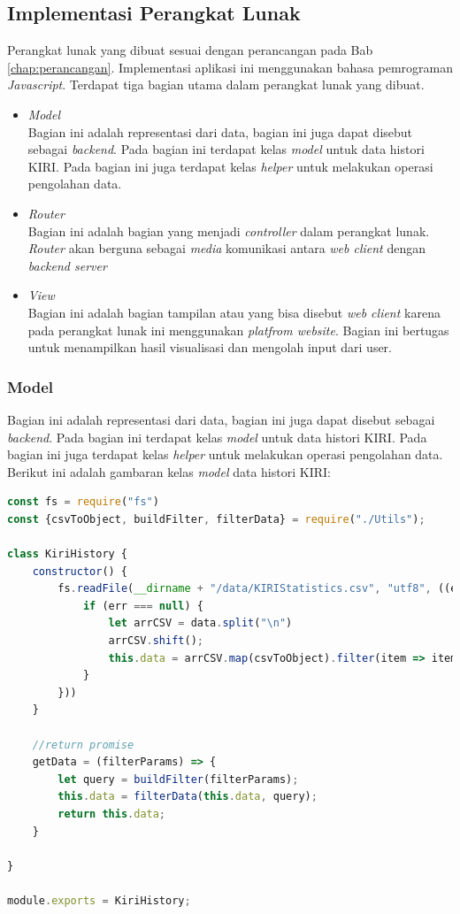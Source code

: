 \subsection{Implementasi Perangkat Lunak}
Perangkat lunak yang dibuat sesuai dengan perancangan pada Bab \ref{chap:perancangan}. Implementasi aplikasi ini menggunakan bahasa pemrograman \textit{Javascript}. Terdapat tiga bagian utama dalam perangkat lunak yang dibuat.

\begin{itemize}
    \item \textit{Model}\\
    Bagian ini adalah representasi dari data, bagian ini juga dapat disebut sebagai \textit{backend}. Pada bagian ini terdapat kelas \textit{model} untuk data histori KIRI. Pada bagian ini juga terdapat kelas \textit{helper} untuk melakukan operasi pengolahan data.
    \item \textit{Router} \\
    Bagian ini adalah bagian yang menjadi \textit{controller} dalam perangkat lunak. \textit{Router} akan berguna sebagai \textit{media} komunikasi antara \textit{web client} dengan \textit{backend server} 
    \item \textit{View} \\
    Bagian ini adalah bagian tampilan atau yang bisa disebut \textit{web client} karena pada perangkat lunak ini menggunakan\textit{ platfrom website}. Bagian ini bertugas untuk menampilkan hasil visualisasi dan mengolah input dari user.
\end{itemize}

\subsubsection{Model}
Bagian ini adalah representasi dari data, bagian ini juga dapat disebut sebagai \textit{backend}. Pada bagian ini terdapat kelas \textit{model} untuk data histori KIRI. Pada bagian ini juga terdapat kelas \textit{helper} untuk melakukan operasi pengolahan data. Berikut ini adalah gambaran kelas \textit{model} data histori KIRI:

\begin{lstlisting}[label=Kiri_Model, language=JavaScript, caption=Metode Load Data, breaklines]
const fs = require("fs")
const {csvToObject, buildFilter, filterData} = require("./Utils");

class KiriHistory {
    constructor() {
        fs.readFile(__dirname + "/data/KIRIStatistics.csv", "utf8", ((err, data) => {
            if (err === null) {
                let arrCSV = data.split("\n")
                arrCSV.shift();
                this.data = arrCSV.map(csvToObject).filter(item => item !== undefined);
            }
        }))
    }

    //return promise
    getData = (filterParams) => {
        let query = buildFilter(filterParams);
        this.data = filterData(this.data, query);
        return this.data;
    }

}

module.exports = KiriHistory;

\end{lstlisting}

